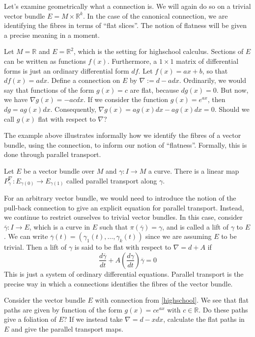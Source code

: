 Let's examine geometrically what a connection is. We will again do so on a trivial vector bundle $E=M\times\mathbb{R}^k$. In the case of the canonical connection, we are identifying the fibres in terms of ``flat slices''. The notion of flatness will be given a precise meaning in a moment.
\begin{example}\label{highschool}
  Let $M=\mathbb{R}$ and $E=\mathbb{R}^2$, which is the setting for highschool calculus. Sections of $E$ can be written as functions $f(x)$. Furthermore, a $1\times 1$ matrix of differential forms is just an ordinary differential form $df$. Let $f(x)=ax+b$, so that $df(x)=adx$. Define a connection on $E$ by $\nabla:=d-adx$. Ordinarily, we would say that functions of the form $g(x)=c$ are flat, because $dg(x)=0$. But now, we have $\nabla g(x)=-acdx$. If we consider the function $g(x)=e^{ax}$, then $dg=ag(x)dx$. Consequently, $\nabla g(x)=ag(x)dx-ag(x)dx=0$. Should we call $g(x)$ flat with respect to $\nabla$?
\end{example}
The example above illustrates informally how we identify the fibres of a vector bundle, using the connection, to inform our notion of ``flatness''. Formally, this is done through parallel transport.
\begin{definition}
  Let $E$ be a vector bundle over $M$ and $\gamma:I\to M$ a curve. There is a linear map $P^\nabla_\gamma:E_{\gamma(0)}\to E_{\gamma(1)}$ called parallel transport along $\gamma$.
\end{definition}
For an arbitrary vector bundle, we would need to introduce the notion of the pull-back connection to give an explicit equation for parallel transport. Instead, we continue to restrict ourselves to trivial vector bundles. In this case, consider $\overline{\gamma}:I\to E$, which is a curve in $E$ such that $\pi(\overline{\gamma})=\gamma$, and is called a lift of $\gamma$ to $E$. We can write $\overline{\gamma}(t)=(\gamma_1(t),\dots,\gamma_k(t))$ since we are assuming $E$ to be trivial. Then a lift of $\gamma$ is said to be flat with respect to $\nabla=d+A$ if
$$\frac{d\overline{\gamma}}{dt}+A(\frac{d\gamma}{dt})\overline{\gamma}=0$$
This is just a system of ordinary differential equations. Parallel transport is the precise way in which a connections identifies the fibres of the vector bundle.
\begin{exercise}
  Consider the vector bundle $E$ with connection from \ref{highschool}. We see that flat paths are given by function of the form $g(x)=ce^{ax}$ with $c\in\mathbb{R}$. Do these paths give a foliation of $E$? If we instead take $\nabla=d-xdx$, calculate the flat paths in $E$ and give the parallel transport maps.
\end{exercise}

